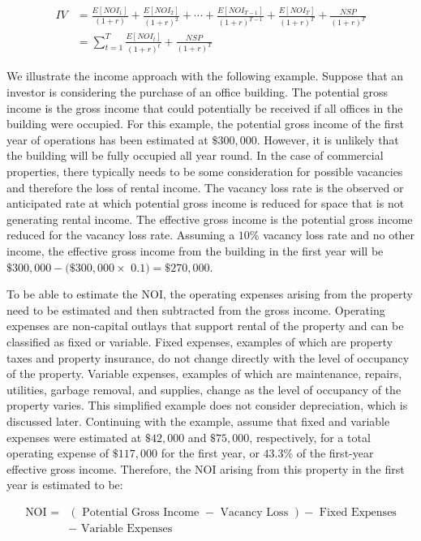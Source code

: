 \documentclass[11pt]{article}
\begin{document}
\begin{align*}
I V & =\frac{E\left[N O I_{1}\right]}{(1+r)}+\frac{E\left[N O I_{2}\right]}{(1+r)^{2}}+\cdots+\frac{E\left[N O I_{T-1}\right]}{(1+r)^{T-1}}+\frac{E\left[N O I_{T}\right]}{(1+r)^{T}}+\frac{N S P}{(1+r)^{T}} \\
& =\sum_{t=1}^{T} \frac{E\left[N O I_{t}\right]}{(1+r)^{t}}+\frac{N S P}{(1+r)^{T}} \tag{2}
\end{align*}


We illustrate the income approach with the following example. Suppose that an investor is considering the purchase of an office building. The potential gross income is the gross income that could potentially be received if all offices in the building were occupied. For this example, the potential gross income of the first year of operations has been estimated at $\$ 300,000$. However, it is unlikely that the building will be fully occupied all year round. In the case of commercial properties, there typically needs to be some consideration for possible vacancies and therefore the loss of rental income. The vacancy loss rate is the observed or anticipated rate at which potential gross income is reduced for space that is not generating rental income. The effective gross income is the potential gross income reduced for the vacancy loss rate. Assuming a $10 \%$ vacancy loss rate and no other income, the effective gross income from the building in the first year will be $\$ 300,000-(\$ 300,000 \times$ $0.1)=\$ 270,000$.

To be able to estimate the NOI, the operating expenses arising from the property need to be estimated and then subtracted from the gross income. Operating expenses are non-capital outlays that support rental of the property and can be classified as fixed or variable. Fixed expenses, examples of which are property taxes and property insurance, do not change directly with the level of occupancy of the property. Variable expenses, examples of which are maintenance, repairs, utilities, garbage removal, and supplies, change as the level of occupancy of the property varies. This simplified example does not consider depreciation, which is discussed later. Continuing with the example, assume that fixed and variable expenses were estimated at $\$ 42,000$ and $\$ 75,000$, respectively, for a total operating expense of $\$ 117,000$ for the first year, or $43.3 \%$ of the first-year effective gross income. Therefore, the NOI arising from this property in the first year is estimated to be:


\begin{align*}
\text { NOI }= & (\text { Potential Gross Income }- \text { Vacancy Loss })-\text { Fixed Expenses }  \tag{3}\\
& - \text { Variable Expenses }
\end{align*}
\end{document}
